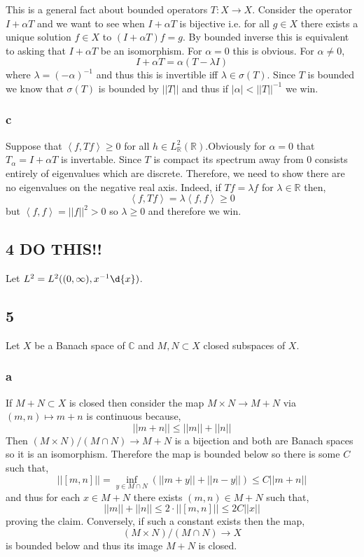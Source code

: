 \documentclass[12pt]{article}
\newcommand{\inner}[2]{\left< #1, #2 \right>}
\newcommand{\R}{\mathbb{R}}
\renewcommand{\C}{\mathbb{C}}
\begin{document}
This is a general fact about bounded operators $T : X \to X$. Consider the operator $I + \alpha T$ and we want to see when $I + \alpha T$ is bijective i.e. for all $g \in X$ there exists a unique solution $f \in X$ to $(I + \alpha T) f = g$. By bounded inverse this is equivalent to asking that $I + \alpha T$ be an isomorphism. For $\alpha = 0$ this is obvious. For $\alpha \neq 0$,
\[ I + \alpha T = \alpha (T - \lambda I) \]
where $\lambda = (-\alpha)^{-1}$ and thus this is invertible iff $\lambda \in \sigma(T)$. Since $T$ is bounded we know that $\sigma(T)$ is bounded by $|| T ||$ and thus if $| \alpha | < || T ||^{-1}$ we win. 

\subsubsection{c}

Suppose that $\inner{f}{Tf} \ge 0$ for all $h \in L^2_\R(\R)$.Obviously for $\alpha = 0$ that $T_\alpha = I + \alpha T$ is invertable. Since $T$ is compact its spectrum away from $0$ consists entirely of eigenvalues which are discrete. Therefore, we need to show there are no eigenvalues on the negative real axis. Indeed, if $T f = \lambda f$ for $\lambda \in \R$ then,
\[ \inner{f}{T f} = \lambda \inner{f}{f} \ge 0 \]
but $\inner{f}{f} = || f ||^2 > 0$ so $\lambda \ge 0$ and therefore we win.

\subsection{4 DO THIS!!}

Let $L^2 = L^2((0, \infty), x^{-1} \d{x})$. 

\subsection{5}

Let $X$ be a Banach space of $\C$ and $M, N \subset X$ closed subspaces of $X$. 

\subsubsection{a}

If $M + N \subset X$ is closed then consider the map $M \times N \to M + N$ via $(m,n) \mapsto m + n$ is continuous because,
\[ || m + n || \le || m || + || n || \]
Then $(M \times N)/(M \cap N) \to M + N$ is a bijection and both are Banach spaces so it is an isomorphism. Therefore the map is bounded below so there is some $C$ such that,
\[ || [m, n] || = \inf_{y \in M \cap N} \left( || m + y || + || n - y|| \right) \le C || m + n || \]
and thus for each $x \in M + N$ there exists $(m,n) \in M + N$ such that,
\[ || m || + || n || \le 2 \cdot || [m, n] || \le 2 C || x || \]
proving the claim. Conversely, if such a constant exists then the map,
\[ (M \times N)/(M \cap N) \to X \]
is bounded below and thus its image $M + N$ is closed. 
\end{document}
